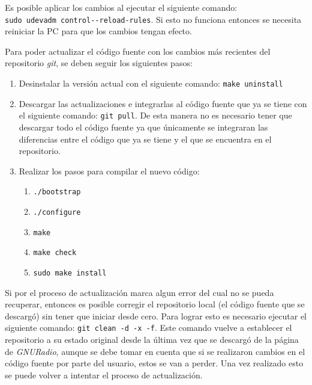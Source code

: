 Es posible aplicar los cambios al ejecutar el siguiente comando:\\
\verb|sudo udevadm control--reload-rules|. Si esto no funciona entonces se necesita reiniciar la PC
para que los cambios tengan efecto.

Para poder actualizar el c\'odigo fuente con los cambios m\'as recientes del repositorio \emph{git}, se deben seguir los
siguientes pasos:

\begin{enumerate}
  \item Desinstalar la versi\'on actual con el siguiente comando: \verb|make uninstall|
  \item Descargar las actualizaciones e integrarlas al c\'odigo fuente que ya se tiene con el siguiente comando:
  \verb|git pull|. De esta manera no es necesario tener que descargar todo el c\'odigo fuente ya que \'unicamente se integraran
  las diferencias entre el c\'odigo que ya se tiene y el que se encuentra en el repositorio.
  \item Realizar los pasos para compilar el nuevo c\'odigo:
  \begin{enumerate}
    \item \verb|./bootstrap|
    \item \verb|./configure|
    \item \verb|make|
    \item \verb|make check|
    \item \verb|sudo make install|
   \end{enumerate}
\end{enumerate}

Si por el proceso de actualizaci\'on marca algun error del cual no se pueda recuperar, entonces es posible corregir
el repositorio local (el c\'odigo fuente que se descarg\'o) sin tener que iniciar desde cero. Para
lograr esto es necesario ejecutar el siguiente comando: \verb|git clean -d -x -f|. Este comando vuelve a establecer el repositorio a su
estado original desde la \'ultima vez que se descarg\'o de la p\'agina de \emph{GNURadio}, aunque se debe tomar en cuenta que si
se realizaron cambios en el c\'odigo fuente por parte del usuario, estos se van a perder. Una vez realizado esto se puede volver a
intentar el proceso de actualizaci\'on.

